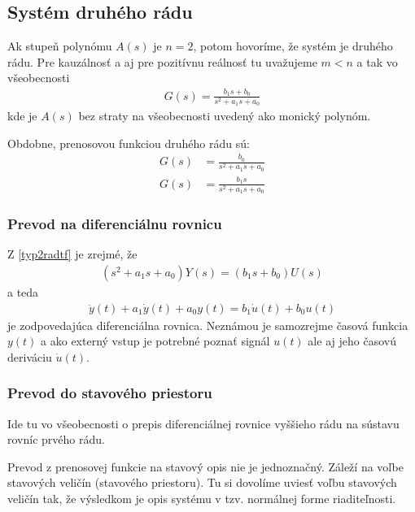\documentclass[a4paper, 10pt, ]{article}
\begin{document}
\subsection{Systém druhého rádu}

Ak stupeň polynómu $A(s)$ je $n = 2$, potom hovoríme, že systém je druhého rádu. Pre kauzálnosť a aj pre pozitívnu reálnosť tu uvažujeme $m<n$ a tak vo všeobecnosti
\begin{align} \label{typ2radtf}
    G(s) = \frac{b_1 s + b_0}{s^2 + a_1 s + a_0}
\end{align}
kde je $A(s)$ bez straty na všeobecnosti uvedený ako monický polynóm.

Obdobne, prenosovou funkciou druhého rádu sú:
\begin{subequations}
    \begin{align}
        G(s) &= \frac{b_0}{s^2 + a_1 s + a_0} \\
        G(s) &= \frac{b_1 s}{s^2 + a_1 s + a_0}
    \end{align}
\end{subequations}


\subsubsection{Prevod na diferenciálnu rovnicu}

Z \eqref{typ2radtf} je zrejmé, že
\begin{align}
    (s^2 + a_1 s + a_0) Y(s) = (b_1 s + b_0) U(s)
\end{align}
a teda
\begin{align} \label{difrovnicanavsimnutie2}
    \ddot y(t) + a_1 \dot y(t) + a_0 y(t) = b_1 \dot u(t) + b_0 u(t)
\end{align}
je zodpovedajúca diferenciálna rovnica. Neznámou je samozrejme časová funkcia $y(t)$ a ako externý vstup je potrebné poznať signál $u(t)$ ale aj jeho časovú deriváciu $\dot u(t)$.




\subsubsection{Prevod do stavového priestoru}

Ide tu vo všeobecnosti o prepis diferenciálnej rovnice vyššieho rádu na sústavu rovníc prvého rádu.

Prevod z prenosovej funkcie na stavový opis nie je jednoznačný. Záleží na voľbe stavových veličín (stavového priestoru). Tu si dovolíme uviesť voľbu stavových veličín tak, že výsledkom je opis systému v tzv. normálnej forme riaditeľnosti.
\end{document}
